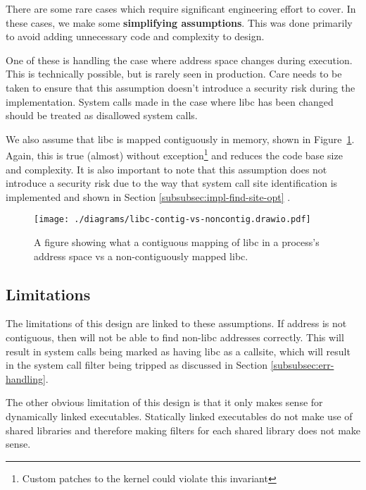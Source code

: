 There are some rare cases which require significant engineering effort to cover.
In these cases, we make some \textbf{simplifying assumptions}. This was done
primarily to avoid adding unnecessary code and complexity to \afg design. 
 
One of these is handling the case where  address space changes during
execution. This is technically possible, but is rarely seen in production.
Care needs to be taken to ensure that this assumption doesn't introduce a
security risk during the implementation. System calls made in the case where 
\ac{libc} has been changed should be treated as disallowed system calls.


We also assume that \ac{libc} is mapped contiguously in memory, shown in
Figure~\ref{fig:libc-contiguous}. Again, this is
true (almost) without exception\footnote{Custom patches to the kernel could
violate this invariant} and reduces the code base size and complexity.
It is also important to note that this assumption does not introduce a security
risk due to the way that system call site identification is implemented and shown in
Section \ref{subsubsec:impl-find-site-opt} \cite{glibc-dl-map-segments-h}.

\begin{figure}[ht]
    \centering
    \texttt{[image: ./diagrams/libc-contig-vs-noncontig.drawio.pdf]} 
    \caption{A figure showing what a contiguous mapping of \ac{libc} in a
    process's address space vs a non-contiguously mapped \ac{libc}.}
    \label{fig:libc-contiguous}
\end{figure}

\subsection{Limitations}

The limitations of this design are linked to these assumptions. If 
address is not contiguous, then \af will not be able to find non-\ac{libc}
addresses correctly. This will result in system calls being marked as having 
\ac{libc} as a callsite, which will result in the system call filter being
tripped as discussed in Section \ref{subsubsec:err-handling}. 

The other obvious limitation of this design is that it only makes sense for
dynamically linked executables. Statically linked executables do not make use of
shared libraries and therefore making filters for each shared library does not
make sense.

